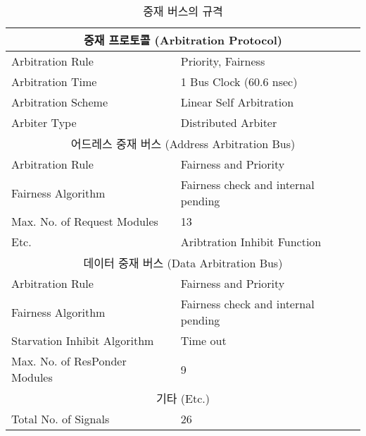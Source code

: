 %
\begin{table}[htbp]
\caption{중재 버스의 규격}\label{table:arb-spec}
   \begin{center}
   \begin{tabular}{|l l|} \hline
    \multicolumn{2}{|c|}{중재 프로토콜 (Arbitration Protocol)} \\ \hline
      Arbitration Rule & Priority, Fairness \\
      Arbitration Time & 1 Bus Clock (60.6 nsec) \\
      Arbitration Scheme & Linear Self Arbitration \\
      Arbiter Type & Distributed Arbiter \\ \hline
    \multicolumn{2}{|c|}{어드레스 중재 버스 (Address Arbitration Bus)} \\ \hline
      Arbitration Rule & Fairness and Priority \\
      Fairness Algorithm & Fairness check and internal pending \\
      Max. No. of Request Modules & 13 \\
      Etc. & Aribtration Inhibit Function \\ \hline
    \multicolumn{2}{|c|}{데이터 중재 버스 (Data Arbitration Bus)} \\ \hline
      Arbitration Rule & Fairness and Priority \\
      Fairness Algorithm & Fairness check and internal pending \\
      Starvation Inhibit Algorithm & Time out \\
      Max. No. of ResPonder Modules & 9 \\ \hline
    \multicolumn{2}{|c|}{기타 (Etc.)} \\ \hline
      Total No. of Signals & 26 \\ \hline
   \end{tabular}
   \end{center}
\end{table}
%
